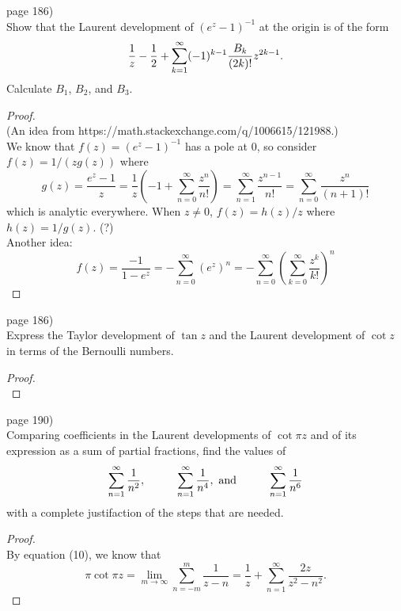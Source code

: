 \documentclass{article}
\newenvironment{problem}[2][Problem]{\begin{trivlist}
\item[\hskip \labelsep {\bfseries #1}\hskip \labelsep {\bfseries #2.}]}{\end{trivlist}}
\begin{document}
\begin{problem}{4} (page 186) \\
  Show that the Laurent development of $(e^z - 1)^{-1}$ at the origin is of the
  form \[
    \frac{1}{z} - \frac{1}{2} +
    \sum\displaylimits_{k = 1}^\infty (-1)^{k-1}\frac{B_k}{(2k)!}z^{2k-1}.
  \]
  Calculate $B_1$, $B_2$, and $B_3$.
\end{problem}
\begin{proof} \text{} \\
  (An idea from https://math.stackexchange.com/q/1006615/121988.)\\
  We know that $f(z) = (e^z - 1)^{-1}$ has a pole at 0, so consider
  $f(z) = 1/(zg(z))$ where \[
    g(z) = \frac{e^{z} - 1}{z}
         = \frac{1}{z}\left(-1 + \sum_{n=0}^\infty \frac{z^n}{n!}\right)
         = \sum_{n=1}^\infty \frac{z^{n-1}}{n!}
         = \sum_{n=0}^\infty \frac{z^n}{(n + 1)!}
  \] which is analytic everywhere. When $z \not= 0$, $f(z) = h(z)/z$ where
  $h(z) = 1/g(z)$.
  (?)\\
  Another idea: \[
    f(z)
      = \frac{-1}{1 - e^z} = -\sum_{n=0}^\infty (e^z)^n
      = -\sum_{n=0}^\infty \left(\sum_{k=0}^\infty\frac{z^k}{k!}\right)^n
  \]
\end{proof}
\pagebreak


\begin{problem}{5} (page 186) \\
  Express the Taylor development of $\tan z$ and the Laurent development of
  $\cot z$ in terms of the Bernoulli numbers.
\end{problem}
\begin{proof} \text{} \\
\end{proof}
\pagebreak


\begin{problem}{1} (page 190) \\
  Comparing coefficients in the Laurent developments of $\cot\pi z$ and of its
  expression as a sum of partial fractions, find the values of \[
    \sum\displaylimits_{n = 1}^\infty \frac{1}{n^2},
    \hspace{1cm}
    \sum\displaylimits_{n = 1}^\infty \frac{1}{n^4}, \text{ and}
    \hspace{1cm}
    \sum\displaylimits_{n = 1}^\infty \frac{1}{n^6}
  \] with a complete justifaction of the steps that are needed.
\end{problem}
\begin{proof} \text{} \\
  By equation (10), we know that \[
    \pi\cot\pi z = \lim_{m\rightarrow\infty}\sum_{n = -m}^{m} \frac { 1} { z - n } = \frac { 1} { z } + \sum _ { n = 1} ^ { \infty } \frac { 2z } { z ^ { 2} - n ^ { 2} }.
  \]
\end{proof}
\pagebreak
\end{document}
